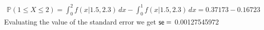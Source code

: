 \documentclass[a4paper,10pt]{article}
\theoremstyle{definition}
\begin{document}
\begin{enumerate}
\begin{enumerate}[(a)]
\begin{align*}
\mathbb{P}(1\leq X \leq 2)=\int_{0}^{2}f(x|1.5,2.3)\,dx-\int_{0}^{1}f(x|1.5,2.3)\,dx=0.37173-0.16723
\end{align*}
Evaluating the value of the standard error we get $\text{\sffamily{se}} =$ 0.00127545972
%
\end{enumerate}
\end{enumerate}
\end{document}
